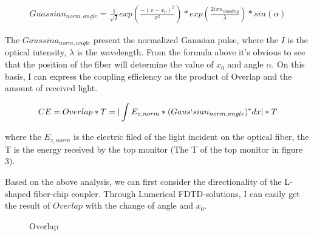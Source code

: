 \documentclass[]{article}
\begin{document}
\begin{align*}
	Guassian_{norm,angle} = \frac{1}{\sqrt{I}}exp(\frac{-(x-x_0)^2}{\sigma^2})*exp(\frac{2i\pi n_{cladding}}{\lambda})*sin(\alpha)
\end{align*}

The $Gaussina_{norm,angle}$ present the normalized Gaussian pulse, where the $I$ is the optical intensity, $\lambda$ is the wavelength. From the formula above it's obvious to see that the position of the fiber will determine the value of $x_0$ and angle $\alpha$. On this basis, I can express the coupling efficiency as the product of Overlap and the amount of received light.

\begin{align*}
	CE = Overlap*T = |\int E_{z,norm} * (Gaus`sian_{norm,angle})^*dx|*T
\end{align*}

where the $E_{z,norm}$ is the electric filed of the light incident on the optical fiber, the T is the energy received by the top monitor (The T of the top monitor in figure 3).

Based on the above analysis, we can first consider the directionality of the L-shaped fiber-chip coupler. Through Lumerical FDTD-solutions, I can easily get the result of $Overlap$ with the change of angle and $x_0$.

\begin{figure}[H]
	\centering
	\caption{Overlap}
	\label{fig:figure4}
\end{figure}
\end{document}
